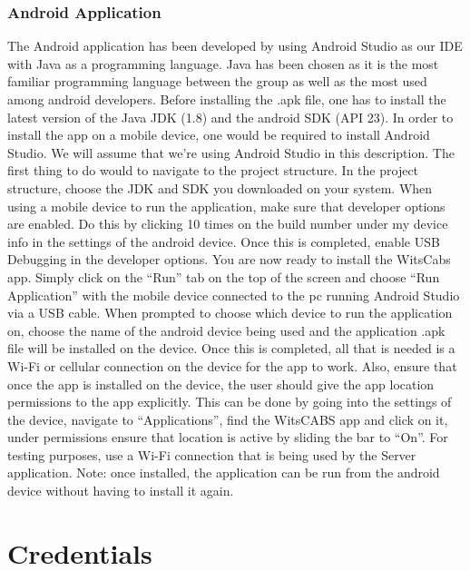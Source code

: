 \documentclass[a4paper,12pt]{article}
\begin{document}
\subsubsection{Android Application}
The Android application has been developed by using Android Studio as our IDE with Java as a programming language. Java has been chosen as it is the most familiar programming language between the group as well as the most used among android developers. Before installing the .apk file, one has to install the latest version of the Java JDK (1.8) and the android SDK (API 23). In order to install the app on a mobile device,  one would be required to install Android Studio. We will assume that we're using Android Studio in this description. The first thing to do would to navigate to the project structure. In the project structure, choose the JDK and SDK you downloaded on your system. 
When using a mobile device to run the application, make sure that developer options are enabled. Do this by clicking 10 times on the build number under my device info in the settings of the android device. Once this is completed, enable USB Debugging in the developer options. You are now ready to install the WitsCabs app. Simply click on the ``Run'' tab on the top of the screen and choose ``Run Application'' with the mobile device connected to the pc running Android Studio via a USB cable. When prompted to choose which device to run the application on, choose the name of the android device being used and the application .apk file will be installed on the device. Once this is completed, all that is needed is a Wi-Fi or cellular connection on the device for the app to work. Also, ensure that once the app is installed on the device, the user should give the app location permissions to the app explicitly. This can be done by going into the settings of the device, navigate to ``Applications'', find the WitsCABS app and click on it, under permissions ensure that location is active by sliding the bar to ``On''. For testing purposes, use a Wi-Fi connection that is being used by the Server application. Note: once installed, the application can be run from the android device without having to install it again.



\pagebreak
\section{Credentials}
\end{document}
